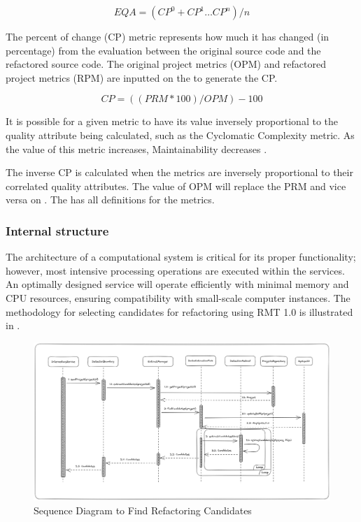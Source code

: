 \begin{equation}%
\label{eq-first-formula}
    EQA=(CP^0+ CP^1…CP^n)/n
\end{equation}

The percent of change (CP) metric represents how much it has changed (in percentage) from the evaluation between the original source code and the refactored source code.
The original project metrics (OPM) and refactored project metrics (RPM) are inputted on the  to generate the CP.

\begin{equation}
\label{eq-secund-formula}
    CP= ((PRM*100)/OPM)-100
\end{equation}

It is possible for a given metric to have its value inversely proportional to the quality attribute being calculated, such as the Cyclomatic Complexity metric. As the value of this metric increases, Maintainability decreases \textcite{beluzzo2018abordagem}. 

The inverse CP is calculated when the metrics are inversely proportional to their correlated quality attributes. The value of OPM will replace the PRM and vice versa on . The  has all definitions for the metrics.



\subsubsection{Internal structure}
\label{subsub-internal}

The architecture of a computational system is critical for its proper functionality; however, most intensive processing operations are executed within the services. An optimally designed service will operate efficiently with minimal memory and CPU resources, ensuring compatibility with small-scale computer instances. The methodology for selecting candidates for refactoring using RMT 1.0 is illustrated in . 


\begin{figure}[ht!]
\SetCaptionWidth{\textwidth}
\caption{Sequence Diagram to Find Refactoring Candidates}
\label{fig-candidates}
\includegraphics[width=160mm]{Chapter-2/Figures/candidates.png}
\end{figure}
\FloatBarrier


